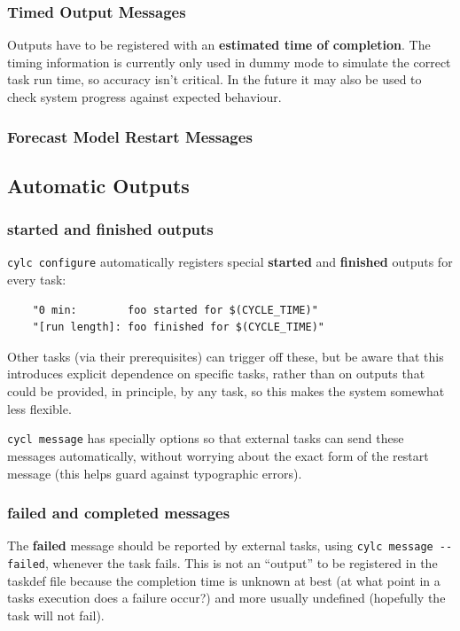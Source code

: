 \documentclass[11pt,a4paper]{article}
\begin{document}
\subsubsection{Timed Output Messages}

Outputs have to be registered with an {\bf estimated time of completion}.
The timing information is currently only used in dummy mode to simulate
the correct task run time, so accuracy isn't critical. In the future
it may also be used to check system progress against expected behaviour.


\subsubsection{Forecast Model Restart Messages}

\subsection{Automatic Outputs}

\subsubsection{started and finished outputs}

\lstinline=cylc configure= automatically registers special {\bf started}
and {\bf finished} outputs for every task: 

\begin{lstlisting}
    "0 min:        foo started for $(CYCLE_TIME)"
    "[run length]: foo finished for $(CYCLE_TIME)"
\end{lstlisting}

Other tasks (via their prerequisites) can trigger off these, but 
be aware that this introduces explicit dependence on specific tasks,
rather than on outputs that could be provided, in principle, by any
task, so this makes the system somewhat less flexible.

\lstinline=cycl message= has specially options so that external tasks
can send these messages automatically, without worrying about the exact
form of the restart message (this helps guard against typographic
errors).


\subsubsection{failed and completed messages}

The {\bf failed} message should be reported by external tasks, using 
\lstinline=cylc message --failed=, whenever the task fails. This is 
not an ``output'' to be registered in the taskdef file because the
completion time is unknown at best (at what point in a tasks execution
does a failure occur?) and more usually undefined (hopefully the task
will not fail). 
\end{document}
